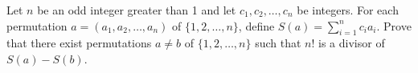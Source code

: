 Let $n$ be an odd integer greater than 1 and let $c_1, c_2, \ldots, c_n$ be integers. For each permutation $a = (a_1, a_2, \ldots, a_n)$ of $\{1, 2, \ldots, n\}$, define $S(a) = \sum_{i=1}^{n} c_i a_i$. Prove that there exist permutations $a \neq b$ of $\{1, 2, \ldots, n\}$ such that $n!$ is a divisor of $S(a) - S(b)$.
